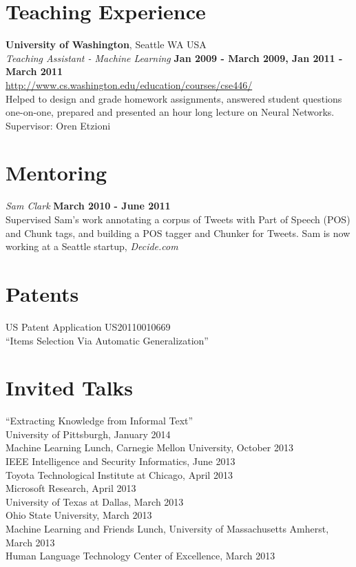 \documentclass[margin,line]{res}
\begin{document}
\begin{resume}
\section{\sc Teaching Experience}

{\bf University of Washington}, Seattle WA USA\\
{\em Teaching Assistant - Machine Learning} \hfill {\bf Jan 2009 - March 2009, Jan 2011 - March 2011} \\
\url{http://www.cs.washington.edu/education/courses/cse446/} \\
Helped to design and grade homework assignments, answered student questions one-on-one, prepared and presented an hour long
lecture on Neural Networks. \\
Supervisor: Oren Etzioni

\section{\sc Mentoring}

{\em Sam Clark} \hfill {\bf March 2010 - June 2011} \\
Supervised Sam's work annotating a corpus of Tweets with Part of Speech (POS) and Chunk tags, and building a POS tagger and Chunker
for Tweets.  Sam is now working at a Seattle startup, {\em Decide.com}

\section{\sc Patents}
US Patent Application US20110010669 \\
``Items Selection Via Automatic Generalization''

\section{\sc Invited Talks}
``Extracting Knowledge from Informal Text'' \\
University of Pittsburgh, January 2014 \\
Machine Learning Lunch, Carnegie Mellon University, October 2013 \\
IEEE Intelligence and Security Informatics, June 2013 \\
Toyota Technological Institute at Chicago, April 2013 \\
Microsoft Research, April 2013 \\
University of Texas at Dallas, March 2013 \\
Ohio State University, March 2013 \\
Machine Learning and Friends Lunch, University of Massachusetts Amherst, March 2013 \\
Human Language Technology Center of Excellence, March 2013 \\


\end{resume}
\end{document}
